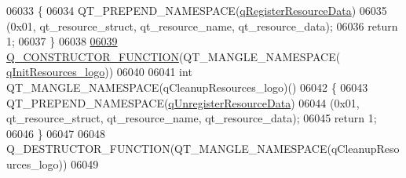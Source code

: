 \begin{DoxyCode}
06033 \{
06034     QT\_PREPEND\_NAMESPACE(\hyperlink{a00126_ab3bec3d1e679084be46edc41e4c91bc1}{qRegisterResourceData})
06035         (0x01, qt\_resource\_struct, qt\_resource\_name, qt\_resource\_data);
06036     \textcolor{keywordflow}{return} 1;
06037 \}
06038 
\hypertarget{a00126_source_l06039}{}\hyperlink{a00126_ae1f71e8cee42447be2c10a353b147b74}{06039} \hyperlink{a00126_ae1f71e8cee42447be2c10a353b147b74}{Q\_CONSTRUCTOR\_FUNCTION}(QT\_MANGLE\_NAMESPACE(
      \hyperlink{a00126_a26f25d34489dcef5b740853d8506af1c}{qInitResources\_logo}))
06040 
06041 int QT\_MANGLE\_NAMESPACE(qCleanupResources\_logo)()
06042 \{
06043     QT\_PREPEND\_NAMESPACE(\hyperlink{a00126_ad65f8bca8010dd1fd135a28a085c6d03}{qUnregisterResourceData})
06044        (0x01, qt\_resource\_struct, qt\_resource\_name, qt\_resource\_data);
06045     \textcolor{keywordflow}{return} 1;
06046 \}
06047 
06048 Q\_DESTRUCTOR\_FUNCTION(QT\_MANGLE\_NAMESPACE(qCleanupResources\_logo))
06049 
\end{DoxyCode}
